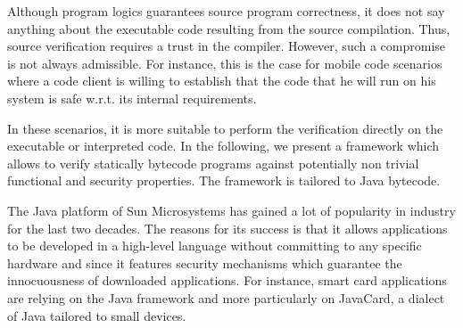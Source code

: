 Although  program logics  guarantees source program correctness, it does not say anything about the executable code
resulting from the source compilation. Thus, source verification requires a  trust in the compiler.
However,  such a compromise is not always admissible. For instance, this is the case for mobile code scenarios where a code client is
 willing to establish that the code that he will run on his system is safe w.r.t. its internal requirements. 
    
In these scenarios, it is more suitable to perform the verification  directly on the  executable or interpreted code.
In the following, we present a framework which allows to verify statically bytecode programs 
against potentially non trivial functional and security properties. The framework is tailored to Java bytecode.

 The Java platform  of Sun Microsystems has gained a lot of popularity in industry  for the last two decades.
 The reasons for its  success is that it allows applications to 
 be developed in a high-level language without committing to any
 specific hardware and since it features security mechanisms which
 guarantee the innocuousness of downloaded applications. 
 For instance, smart card applications are relying on the Java framework and
 more particularly on JavaCard, a dialect of Java tailored to small devices. 

